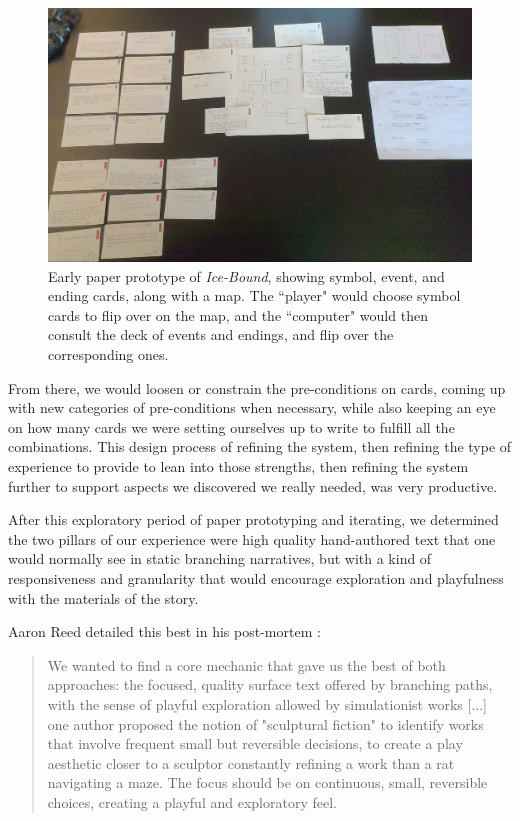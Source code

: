\begin{figure}
    \centering
    \includegraphics[width=\textwidth]{figures/2-Ice-Bound/prototype.jpg}
    \caption{Early paper prototype of \textit{Ice-Bound}, showing symbol, event, and ending cards, along with a map. The ``player" would choose symbol cards to flip over on the map, and the ``computer" would then consult the deck of events and endings, and flip over the corresponding ones.}
    \label{fig:prototype}
\end{figure}


From there, we would loosen or constrain the pre-conditions on cards, coming up with new categories of pre-conditions when necessary, while also keeping an eye on how many cards we were setting ourselves up to write to fulfill all the combinations. This design process of refining the system, then refining the type of experience to provide to lean into those strengths, then refining the system further to support aspects we discovered we really needed, was very productive.

After this exploratory period of paper prototyping and iterating, we determined the two pillars of our experience were high quality hand-authored text that one would normally see in static branching narratives, but with a kind of responsiveness and granularity that would encourage exploration and playfulness with the materials of the story.

Aaron Reed detailed this best in his post-mortem \cite{reed2014ice}:

\begin{quote}
We wanted to find a core mechanic that gave us the best of both approaches: the focused, quality surface text offered by branching paths, with the sense of playful exploration allowed by simulationist works [...] one author proposed the notion of "sculptural fiction" to identify works that involve frequent small but reversible decisions, to create a play aesthetic closer to a sculptor constantly refining a work than a rat navigating a maze. The focus should be on continuous, small, reversible choices, creating a playful and exploratory feel.
\end{quote}

